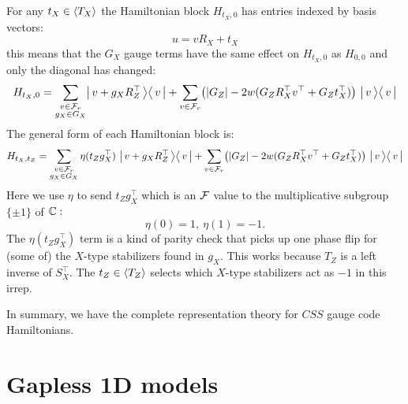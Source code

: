 For any $t_X\in \langle T_X \rangle$ the Hamiltonian block $H_{t_X,0}$
has entries indexed by basis vectors:
$$
    u = v R_X + t_X
$$
this means that the $G_X$ gauge terms
have the same effect on $H_{t_X,0}$
as $H_{0,0}$ and only the diagonal has changed:
\begin{equation}\label{hamblocktx}
H_{t_X,0} = \sum_{\substack{v\in\mathcal{F}_{r}\\g_X\in G_X } }
  \bigl|\,{v+g_X  R_Z^\top}\,\bigr\rangle\bigl\langle\,{v}\,\bigr| 
  + \sum_{v\in\mathcal{F}_{r}} \bigl(
    |G_Z| - 2w(G_Z R_X^\top v^\top + G_Z t_X^\top)
    \bigr) \ \bigl|\,{v}\,\bigr\rangle\bigl\langle\,{v}\,\bigr|
\end{equation}
The general form of
each Hamiltonian block is:
\begin{equation}\label{hamblockgen}
H_{t_X,t_Z} = \sum_{\substack{v\in\mathcal{F}_{r}\\g_X\in G_X } }
    \eta(t_Z g_X^\top)
  \ \bigl|\,{v+g_X  R_Z^\top}\,\bigr\rangle\bigl\langle\,{v}\,\bigr| 
  + \sum_{v\in\mathcal{F}_{r}} \bigl(
    |G_Z| - 2w(G_Z R_X^\top v^\top + G_Z t_X^\top)
    \bigr) \ \bigl|\,{v}\,\bigr\rangle\bigl\langle\,{v}\,\bigr|
\end{equation}
Here we use $\eta$ to send 
$t_Zg_X^\top$ which is an $\mathcal{F}$ value
to the multiplicative subgroup $\{\pm1\}$
of $\mathbb{C}:$
$$
    \eta(0) = 1,\ \eta(1) = -1.
$$
The $\eta(t_Zg_X^\top)$ term
is a kind of parity check that
picks up one phase flip for (some of)
the $X$-type stabilizers found in $g_X.$
This works because $T_Z$ is a left inverse
of $S_X^\top.$
The $t_Z\in\langle T_Z \rangle$ selects which
$X$-type stabilizers act as $-1$ in this irrep.

In summary, we have the complete representation
theory for $CSS$ gauge code Hamiltonians.


%

\section{Gapless 1D models}


